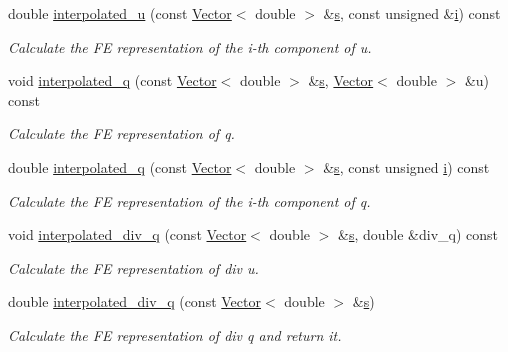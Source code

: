 \begin{DoxyCompactItemize}
double \hyperlink{classoomph_1_1PoroelasticityEquations_a252bb0aa85c006d1a69b60df24d8a206}{interpolated\+\_\+u} (const \hyperlink{classoomph_1_1Vector}{Vector}$<$ double $>$ \&\hyperlink{cfortran_8h_ab7123126e4885ef647dd9c6e3807a21c}{s}, const unsigned \&\hyperlink{cfortran_8h_adb50e893b86b3e55e751a42eab3cba82}{i}) const
\begin{DoxyCompactList}\small\item\em Calculate the FE representation of the i-\/th component of u. \end{DoxyCompactList}\item 
void \hyperlink{classoomph_1_1PoroelasticityEquations_a693a649af090f9d921ed10326d8c68a5}{interpolated\+\_\+q} (const \hyperlink{classoomph_1_1Vector}{Vector}$<$ double $>$ \&\hyperlink{cfortran_8h_ab7123126e4885ef647dd9c6e3807a21c}{s}, \hyperlink{classoomph_1_1Vector}{Vector}$<$ double $>$ \&u) const
\begin{DoxyCompactList}\small\item\em Calculate the FE representation of q. \end{DoxyCompactList}\item 
double \hyperlink{classoomph_1_1PoroelasticityEquations_acc0ef084dfaa656827ba4444475df2ba}{interpolated\+\_\+q} (const \hyperlink{classoomph_1_1Vector}{Vector}$<$ double $>$ \&\hyperlink{cfortran_8h_ab7123126e4885ef647dd9c6e3807a21c}{s}, const unsigned \hyperlink{cfortran_8h_adb50e893b86b3e55e751a42eab3cba82}{i}) const
\begin{DoxyCompactList}\small\item\em Calculate the FE representation of the i-\/th component of q. \end{DoxyCompactList}\item 
void \hyperlink{classoomph_1_1PoroelasticityEquations_ad391ac29fbda008d06f6c97330cf0bad}{interpolated\+\_\+div\+\_\+q} (const \hyperlink{classoomph_1_1Vector}{Vector}$<$ double $>$ \&\hyperlink{cfortran_8h_ab7123126e4885ef647dd9c6e3807a21c}{s}, double \&div\+\_\+q) const
\begin{DoxyCompactList}\small\item\em Calculate the FE representation of div u. \end{DoxyCompactList}\item 
double \hyperlink{classoomph_1_1PoroelasticityEquations_a6702594fe37c9b7e3d17e9fe85bf887e}{interpolated\+\_\+div\+\_\+q} (const \hyperlink{classoomph_1_1Vector}{Vector}$<$ double $>$ \&\hyperlink{cfortran_8h_ab7123126e4885ef647dd9c6e3807a21c}{s})
\begin{DoxyCompactList}\small\item\em Calculate the FE representation of div q and return it. \end{DoxyCompactList}\item 

\end{DoxyCompactItemize}
